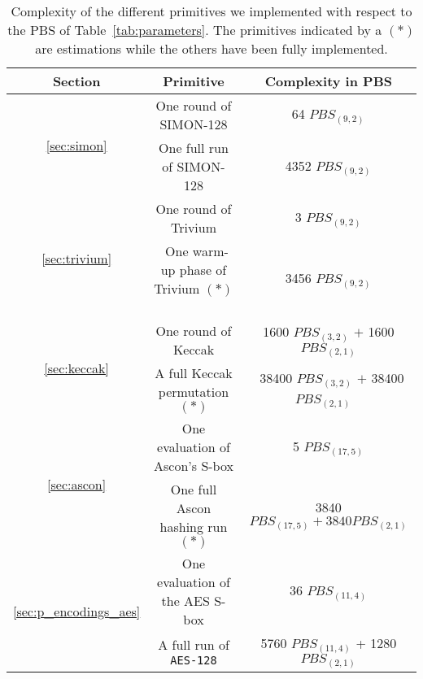 \begin{table}
    \centering
    \begin{tabular}{|c|c|c|}
        \hline
        \textbf{Section} & \textbf{Primitive} & \textbf{Complexity in \gls{PBS}}  \\
        \hline
        \multirow{2}{*}{\ref{sec:simon}} & One round of SIMON-128 & 64 \texttt{$PBS_{(9, 2)}$}\\
        \cline{2-3}
        & One full run of SIMON-128 & 4352 \texttt{$PBS_{(9, 2)}$}\\
        \hline
        \multirow{2}{*}{\ref{sec:trivium}} & One round of Trivium & 3 \texttt{$PBS_{(9, 2)}$}\\
        \cline{2-3}
        & ~One warm-up phase of Trivium $(*)$~ & 3456 \texttt{$PBS_{(9, 2)}$}\\
        \hline
        \multirow{2}{*}{\ref{sec:keccak}} & One round of Keccak & 1600 \texttt{$PBS_{(3, 2)}$} $+$ 1600 \texttt{$PBS_{(2, 1)}$}\\
        \cline{2-3}
        & A full Keccak permutation $(*)$ & ~38400 \texttt{$PBS_{(3, 2)}$} $+$ 38400 \texttt{$PBS_{(2, 1)}$} ~\\
        \hline
      \multirow{2}{*}{ \ref{sec:ascon}} & One evaluation of Ascon's S-box & 5 \texttt{$PBS_{(17, 5)}$}\\
      \cline{2-3}
      & One full Ascon hashing run $(*)$ & 3840 \texttt{$PBS_{(17, 5)} + 3840 PBS_{(2, 1)}$}\\
        \hline
        \multirow{2}{*}{\ref{sec:p_encodings_aes}} & One evaluation of the \gls{AES} S-box & 36 \texttt{$PBS_{(11, 4)}$}\\
        \cline{2-3}
        & A full run of \texttt{\gls{AES}-128}  & 5760 \texttt{$PBS_{(11, 4)}$} + 1280 \texttt{$PBS_{(2, 1)}$}\\
        \hline
    \end{tabular}
    \medskip
    \caption{Complexity of the different primitives we implemented with respect to the \gls{PBS} of Table~\ref{tab:parameters}. The primitives indicated by a $(*)$ are estimations while the others have been fully implemented.}
    \label{tab:complexity_primitives}
\end{table}



